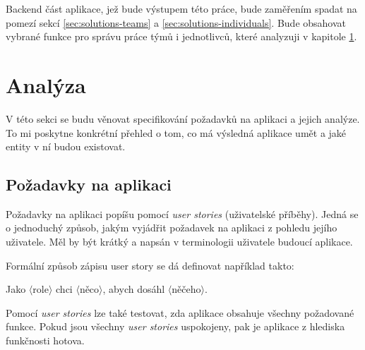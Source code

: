 \documentclass[thesis=B,czech]{FITthesis}[2012/06/26]
\begin{document}
		Backend část aplikace, jež bude výstupem této práce, bude zaměřením spadat na pomezí sekcí \ref{sec:solutions-teams} a \ref{sec:solutions-individuals}. Bude obsahovat vybrané funkce pro správu práce týmů i jednotlivců, které analyzuji v kapitole \ref{chapter:analysis}.

	
\chapter{Analýza}
	\label{chapter:analysis}
	
	V této sekci se budu věnovat specifikování požadavků na aplikaci a jejich analýze. To mi poskytne konkrétní přehled o tom, co má výsledná aplikace umět a jaké entity v ní budou existovat.
	
	\section{Požadavky na aplikaci}
		Požadavky na aplikaci popíšu pomocí \textit{user stories} (uživatelské příběhy)\cite{user-stories}. Jedná se o jednoduchý způsob, jakým vyjádřit požadavek na aplikaci z pohledu jejího uživatele. Měl by být krátký a napsán v terminologii uživatele budoucí aplikace.
		
		Formální způsob zápisu user story se dá definovat \cite{user-stories-applied-book} například takto:
		\begin{center}
			Jako $\langle$role$\rangle$ chci $\langle$něco$\rangle$, abych dosáhl $\langle$něčeho$\rangle$.
		\end{center}
		Pomocí \textit{user stories} lze také testovat, zda aplikace obsahuje všechny požadované funkce. Pokud jsou všechny \textit{user stories} uspokojeny, pak je aplikace z hlediska funkčnosti hotova.
		
\end{document}
